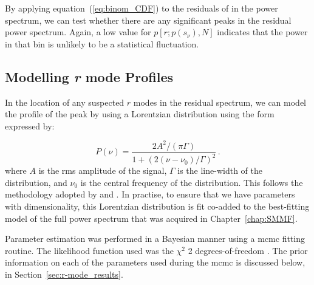 By applying equation~(\ref{eq:binom_CDF}) to the residuals of in the power spectrum, we can test whether there are any significant peaks in the residual power spectrum. Again, a low value for $p[r; p(s_\nu), N]$ indicates that the power in that bin is unlikely to be a statistical fluctuation.


%
%



\subsection{Modelling {\it r} mode Profiles}
In the location of any suspected $r$ modes in the residual spectrum, we can model the profile of the peak by using a Lorentzian distribution using the form expressed by:

\begin{equation}
P(\nu) = \frac{2A^2/(\pi \Gamma)}{1 + (2(\nu - \nu_0)/\Gamma)^2} \, .
\label{eq:lorentzian}
\end{equation}
%
where $A$ is the \gls{rms} amplitude of the signal, $\Gamma$ is the line-width of the distribution, and $\nu_0$ is the central frequency of the distribution. This follows the methodology adopted by \citet{loptien_global-scale_2018} and \citet{liang_time-distance_2019}. In practise, to ensure that we have parameters with dimensionality, this Lorentzian distribution is fit co-added to the best-fitting model of the full power spectrum that was acquired in Chapter~\ref{chap:SMMF}.

Parameter estimation was performed in a Bayesian manner using a \gls{mcmc} fitting routine. The likelihood function used was the $\chi^2$ 2 degrees-of-freedom \citep{handberg_bayesian_2011, davies_low-frequency_2014}. The prior information on each of the parameters used during the \gls{mcmc} is discussed below, in Section~\ref{sec:r-mode_results}.

